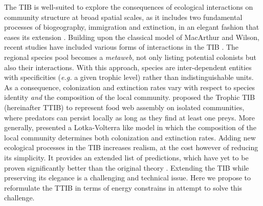 The TIB is well-suited to explore the consequences of ecological
interactions on community structure at broad spatial scales, as it
includes two fundamental processes of biogeography, immigration and
extinction, in an elegant fashion that eases its extension
\citep{Losos2010, Warren2015}. Building upon the classical model of
MacArthur and Wilson, recent studies have included various forms of
interactions in the TIB \citep[ ]{Gravel2011, Cazelles2016a}. The
regional species pool becomes a \emph{metaweb}, not only listing
potential colonists but also their interactions. With this approach,
species are inter-dependent entities with specificities (\emph{e.g.} a
given trophic level) rather than indistinguishable units. As a
consequence, colonization and extinction rates vary with respect to
species identity \emph{and} the composition of the local community.
\citet{Gravel2011} proposed the Trophic TIB (hereinafter TTIB) to
represent food web assembly on isolated communities, where predators can
persist locally as long as they find at least one preys. More generally,
\citet{Cazelles2016a} presented a Lotka-Volterra like model in which the
composition of the local community determines both colonization and
extinction rates. Adding new ecological processes in the TIB increases
realism, at the cost however of reducing its simplicity. It provides an
extended list of predictions, which have yet to be proven significantly
better than the original theory \citep[see][]{Cirtwill2015}. Extending
the TIB while preserving its elegance is a challenging and technical
issue. Here we propose to reformulate the TTIB in terms of energy
constrains in attempt to solve this challenge.

